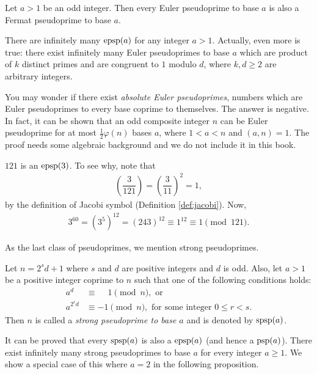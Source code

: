 \documentclass{subfile}
\begin{document}
	\begin{corollary}
		Let $a>1$ be an odd integer. Then every Euler pseudoprime to base $a$ is also a Fermat pseudoprime to base $a$.
	\end{corollary}
	
There are infinitely many $\operatorname{epsp}(a)$ for any integer $a>1$. Actually, even more is true: there exist infinitely many Euler pseudoprimes to base $a$ which are product of $k$ distinct primes and are congruent to $1$ modulo $d$, where $k, d \geq 2$ are arbitrary integers.

You may wonder if there exist \textit{absolute Euler pseudoprimes}, numbers which are Euler pseudoprimes to every base coprime to themselves. The answer is negative. In fact, it can be shown that an odd composite integer $n$ can be Euler pseudoprime for at most $\frac{1}{2}\varphi(n)$ bases $a$, where $1<a<n$ and $(a,n)=1$. The proof needs some algebraic background and we do not include it in this book.

	\begin{example}
		$121$ is an $\operatorname{epsp}(3)$. To see why, note that
			\begin{align*}
				\left(\dfrac{3}{121}\right) = \left(\dfrac{3}{11}\right)^2 = 1,
			\end{align*}
		by the definition of Jacobi symbol (Definition \ref{def:jacobi}). Now,
			\begin{align*}
				3^{60} = \left(3^5\right)^{12} =\left(243\right)^{12} \equiv 1^{12} \equiv 1 \pmod{121}.
			\end{align*}
	\end{example}
	
As the last class of pseudoprimes, we mention strong pseudoprimes.

	\begin{definition}
		Let $n=2^sd+1$ where $s$ and $d$ are positive integers and $d$ is odd. Also, let $a>1$ be a positive integer coprime to $n$ such that one of the following conditions holds:
			\begin{align*}
				a^d &\equiv \phantom{-} 1 \pmod n, \text{ or}\\
				a^{2^rd} &\equiv -1 \pmod n, \text{ for some integer } 0 \leq r <s.
			\end{align*}
		Then $n$ is called a \textit{strong pseudoprime to base $a$} and is denoted by $\operatorname{spsp}(a)$.
	\end{definition}
It can be proved that every $\operatorname{spsp}(a)$ is also a $\operatorname{epsp}(a)$ (and hence a $\operatorname{psp}(a)$). There exist infinitely many strong pseudoprimes to base $a$ for every integer $a \geq 1$. We show a special case of this where $a=2$ in the following proposition.
	
\end{document}
